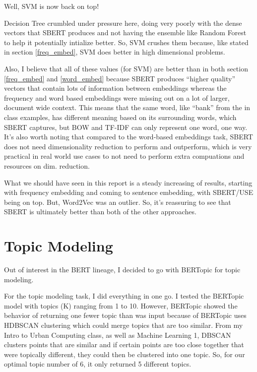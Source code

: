 \documentclass[12pt]{article}
\begin{document}
Well, SVM is now back on top! 

Decision Tree crumbled under pressure here, doing very poorly with the dense vectors that SBERT produces and 
not having the ensemble like Random Forest to help it potentially intialize better. So, SVM crushes them 
because, like stated in section \ref{freq_embed}, SVM does better in high dimensional problems. 

Also, I believe that all of these values (for SVM) are better than in both section \ref{freq_embed} and 
\ref{word_embed} because SBERT produces ``higher quality'' vectors that contain lots of information 
between embeddings whereas the frequency and word based embeddings were missing out on a lot of 
larger, document wide context. This means that the same word, like ``bank'' from the in class examples, 
has different meaning based on its surrounding words, which SBERT captures, but BOW and TF-IDF can only 
represent one word, one way. It's also worth noting that compared to the word-based embeddings task, SBERT 
does not need dimensionality reduction to perform and outperform, which is very practical in real world 
use cases to not need to perform extra compuations and resources on dim. reduction.

What we should have seen in this report is a steady increasing of results, starting with frequency embedding 
and coming to sentence embedding, with SBERT/USE being on top. But, Word2Vec was an outlier. So, it's 
reassuring to see that SBERT is ultimately better than both of the other approaches.

\section*{Topic Modeling}

Out of interest in the BERT lineage, I decided to go with BERTopic for topic modeling. 

For the topic modeling task, I did everything in one go. I tested the BERTopic model with topics (K) 
ranging from 1 to 10. However, BERTopic showed the behavior of returning one fewer topic than was input because
of BERTopic uses HDBSCAN clustering which could merge topics that are too similar. From my Intro to 
Urban Computing class, as well as Machine Learning 1, DBSCAN clusters points that are similar and if 
certain points are too close together that were topically different, they could then be clustered into 
one topic. So, for our optimal topic number of 6, it only returned 5 different topics. 
\end{document}
